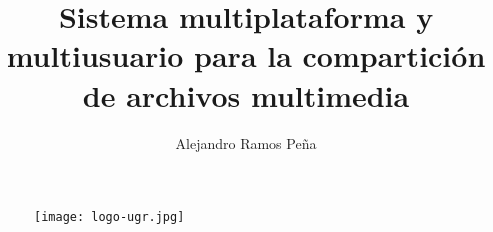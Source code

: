 \documentclass[11pt]{book}
\title{Sistema multiplataforma y multiusuario para la compartición de
archivos multimedia}
\author{Alejandro Ramos Peña}
\begin{document}
\begin{titlingpage}
  \begin{figure}[!h]
    \centering
    \texttt{[image: logo-ugr.jpg]}
  \end{figure}
  \maketitle
\end{titlingpage}

\tableofcontents

\newpage
\listoffigures

\newpage
\renewcommand{\listtablename}{Índice de Tablas}
\listoftables

\newpage

\printglossaries

\newpage


\newpage















\printbibliography[title=Bibliografía]
\end{document}
